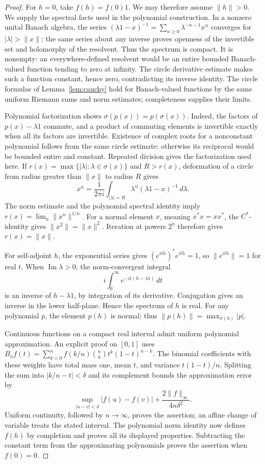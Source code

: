 \begin{proof}
For $h=0$, take $f(h)=f(0)1$.  We may therefore assume $\|h\|>0$.
We supply the spectral facts used in the polynomial construction.
In a nonzero unital Banach algebra, the series
$(\lambda1-x)^{-1}=\sum_{n\geq0}\lambda^{-n-1}x^n$ converges for
$|\lambda|>\|x\|$; the same series about any inverse proves openness of the
invertible set and holomorphy of the resolvent.
Thus the spectrum is compact.  It is nonempty: an everywhere-defined
resolvent would be an entire bounded Banach-valued function tending to zero
at infinity.  The circle derivative estimate makes such a function constant,
hence zero, contradicting its inverse identity.
The circle formulas of Lemma~\ref{lem:cauchy} hold for Banach-valued
functions by the same uniform Riemann sums and norm estimates; completeness
supplies their limits.

Polynomial factorization shows $\sigma(p(x))=p(\sigma(x))$.
Indeed, the factors of $p(x)-\lambda1$ commute, and a product of commuting
elements is invertible exactly when all its factors are invertible.
Existence of complex roots for a nonconstant polynomial follows from the
same circle estimate: otherwise its reciprocal would be bounded entire and
constant.  Repeated division gives the factorization used here.
If $r(x)=\max\{|\lambda|:\lambda\in\sigma(x)\}$ and $R>r(x)$, deformation
of a circle from radius greater than $\|x\|$ to radius $R$ gives
\[
 x^n=\frac1{2\pi i}\int_{|\lambda|=R}
           \lambda^n(\lambda1-x)^{-1}\,d\lambda.
\]
The norm estimate and the polynomial spectral identity imply
$r(x)=\lim_n\|x^n\|^{1/n}$.
For a normal element $x$, meaning $x^*x=xx^*$, the $C^*$-identity gives
$\|x^2\|=\|x\|^2$.  Iteration at powers $2^n$ therefore gives
$r(x)=\|x\|$.

For self-adjoint $h$, the exponential series gives
$(e^{ith})^*e^{ith}=1$, so $\|e^{ith}\|=1$ for real $t$.
When $\operatorname{Im}\lambda>0$, the norm-convergent integral
\[
 i\int_0^\infty e^{-it(h-\lambda1)}\,dt
\]
is an inverse of $h-\lambda1$, by integration of its derivative.
Conjugation gives an inverse in the lower half-plane.  Hence the spectrum
of $h$ is real.  For any polynomial $p$, the element $p(h)$ is normal;
thus $\|p(h)\|=\max_{\sigma(h)}|p|$.

Continuous functions on a compact real interval admit uniform polynomial
approximation.  An explicit proof on $[0,1]$ uses
$B_nf(t)=\sum_{k=0}^n f(k/n)\binom nk t^k(1-t)^{n-k}$.
The binomial coefficients with these weights have total mass one, mean
$t$, and variance $t(1-t)/n$.  Splitting the sum into $|k/n-t|<\delta$
and its complement bounds the approximation error by
\[
 \sup_{|u-v|<\delta}|f(u)-f(v)|+
       \frac{2\|f\|_\infty}{4n\delta^2}.
\]
Uniform continuity, followed by $n\to\infty$, proves the assertion;
an affine change of variable treats the stated interval.
The polynomial norm identity now defines $f(h)$ by completion and proves
all its displayed properties.  Subtracting the constant term from the
approximating polynomials proves the assertion when $f(0)=0$.


\end{proof}
